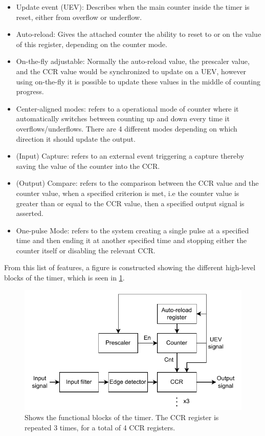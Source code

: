 \documentclass[./dissertation.tex]{subfiles}
\begin{document}
\begin{itemize}
    \item Update event (UEV): Describes when the main counter inside the timer is reset, either from overflow or underflow.
    \item Auto-reload: Gives the attached counter the ability to reset to or on the value of this register, depending on the counter mode.
    \item On-the-fly adjustable: Normally the auto-reload value, the prescaler value, and the CCR value would be synchronized to update on a UEV, however using on-the-fly it is possible to update these values in the middle of counting progress.
    \item Center-aligned modes: refers to a operational mode of counter where it automatically switches between counting up and down every time it overflows/underflows. There are 4 different modes depending on which direction it should update the output. 
    \item (Input) Capture: refers to an external event triggering a capture thereby saving the value of the counter into the CCR.
    \item (Output) Compare: refers to the comparison between the CCR value and the counter value, when a specified criterion is met, i.e the counter value is greater than or equal to the CCR value, then a specified output signal is asserted.
    \item One-pulse Mode: refers to the system creating a single pulse at a specified time and then ending it at another specified time and stopping either the counter itself or disabling the relevant CCR.
\end{itemize}

From this list of features, a figure is constructed showing the different high-level blocks of the timer, which is seen in \ref{fig:timer_block_dia}. 

\begin{figure}[H]
    \centering
    \includegraphics[width = 0.8\linewidth]{subfiles/imgs/IP_Blocks_Pics/timer_block_dia.drawio.pdf}
    \caption{Shows the functional blocks of the timer. The CCR register is repeated 3 times, for a total of 4 CCR registers.}
    \label{fig:timer_block_dia}
\end{figure}
\end{document}
